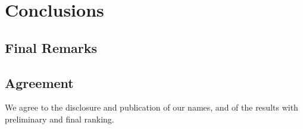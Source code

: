 \section{Conclusions}

\subsection{Final Remarks}


\subsection{Agreement}
We agree to the disclosure and publication of our names, and of the results with preliminary and final ranking.


